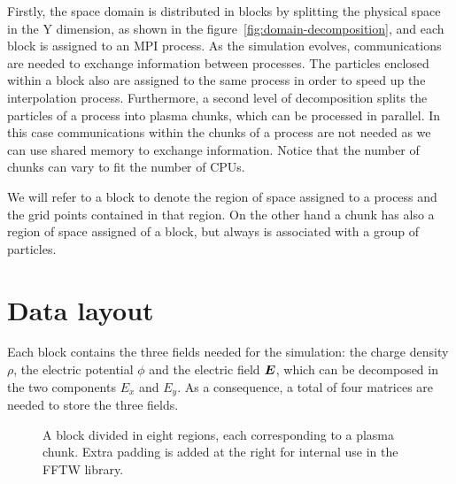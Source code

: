 Firstly, the space domain is distributed in blocks by splitting the physical 
space in the Y dimension, as shown in the figure~\ref{fig:domain-decomposition}, 
and each block is assigned to an MPI process. As the simulation evolves, 
communications are needed to exchange information between processes. The 
particles enclosed within a block also are assigned to the same process in order 
to speed up the interpolation process. Furthermore, a second level of 
decomposition splits the particles of a process into plasma chunks, which can be 
processed in parallel. In this case communications within the chunks of a 
process are not needed as we can use shared memory to exchange information.  
Notice that the number of chunks can vary to fit the number of CPUs.

We will refer to a block to denote the region of space assigned to a process and 
the grid points contained in that region. On the other hand a chunk has also a 
region of space assigned of a block, but always is associated with a group of 
particles.

\section{Data layout}

Each block contains the three fields needed for the simulation: the charge 
density $\rho$, the electric potential $\phi$ and the electric field $\bm{E}$, which 
can be decomposed in the two components $E_x$ and $E_y$. As a consequence, a 
total of four matrices are needed to store the three fields.

\begin{figure}[h]%
\centering
{}
\caption{A block divided in eight regions, each corresponding to a plasma chunk.  
Extra padding is added at the right for internal use in the FFTW library.}
\label{fig:block}
\end{figure}%

